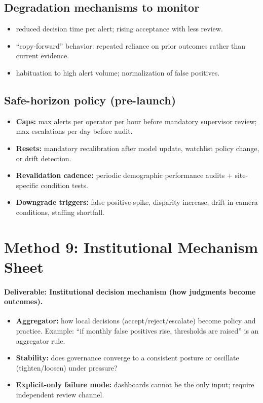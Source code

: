 \subsection*{Degradation mechanisms to monitor}
\begin{itemize}
  \item reduced decision time per alert; rising acceptance with less review.
  \item “copy-forward” behavior: repeated reliance on prior outcomes rather than current evidence.
  \item habituation to high alert volume; normalization of false positives.
\end{itemize}

\subsection*{Safe-horizon policy (pre-launch)}
\begin{itemize}
  \item \textbf{Caps:} max alerts per operator per hour before mandatory supervisor review; max escalations per day before audit.
  \item \textbf{Resets:} mandatory recalibration after model update, watchlist policy change, or drift detection.
  \item \textbf{Revalidation cadence:} periodic demographic performance audits + site-specific condition tests.
  \item \textbf{Downgrade triggers:} false positive spike, disparity increase, drift in camera conditions, staffing shortfall.
\end{itemize}

\section{Method 9: Institutional Mechanism Sheet}
\label{sec:airport-m9}

\paragraph{Deliverable: Institutional decision mechanism (how judgments become outcomes).}

\begin{itemize}
  \item \textbf{Aggregator:} how local decisions (accept/reject/escalate) become policy and practice.
        Example: “if monthly false positives rise, thresholds are raised” is an aggregator rule.
  \item \textbf{Stability:} does governance converge to a consistent posture or oscillate (tighten/loosen) under pressure?
  \item \textbf{Explicit-only failure mode:} dashboards cannot be the only input; require independent review channel.
\end{itemize}

